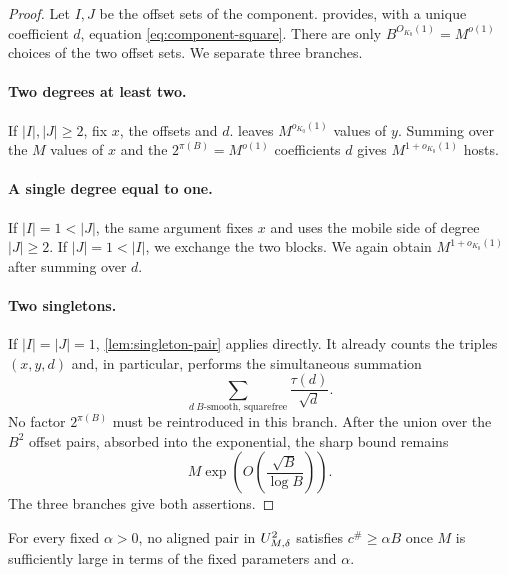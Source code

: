 \begin{proof}
Let $I,J$ be the offset sets of the component.
 provides, with a unique coefficient
$d$, equation \eqref{eq:component-square}. There are only
$B^{O_{K_0}(1)}=M^{o(1)}$ choices of the two offset sets. We separate
three branches.

\paragraph{Two degrees at least two.}
If $|I|,|J|\ge2$, fix $x$, the offsets and $d$.
 leaves $M^{o_{K_0}(1)}$ values of
$y$. Summing over the $M$ values of $x$ and the
$2^{\pi(B)}=M^{o(1)}$ coefficients $d$ gives
$M^{1+o_{K_0}(1)}$ hosts.

\paragraph{A single degree equal to one.}
If $|I|=1<|J|$, the same argument fixes $x$ and uses the mobile side of
degree $|J|\ge2$. If $|J|=1<|I|$, we exchange the two blocks. We again
obtain $M^{1+o_{K_0}(1)}$ after summing over $d$.

\paragraph{Two singletons.}
If $|I|=|J|=1$, \cref{lem:singleton-pair} applies directly. It already
counts the triples $(x,y,d)$ and, in particular, performs the
simultaneous summation
\[
 \sum_{d\ B\text{-smooth, squarefree}}\frac{\tau(d)}{\sqrt d}.
\]
No factor $2^{\pi(B)}$ must be reintroduced in this branch.
After the union over the $B^2$ offset pairs, absorbed into the
exponential, the sharp bound remains
\[
 M\exp\!\left(O\!\left(\frac{\sqrt B}{\log B}\right)\right).
\]
The three branches give both assertions.
\end{proof}
\begin{proposition}\label{macro:prop:aligned}
For every fixed $\alpha>0$, no aligned pair in $U_{M,\delta}^2$ satisfies
$c^\#\geq\alpha B$ once $M$ is sufficiently large in terms of the
fixed parameters and $\alpha$.
\end{proposition}

